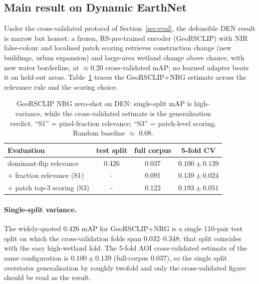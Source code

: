 \documentclass{article}
\begin{document}
\subsection{Main result on Dynamic EarthNet}
\label{sec:denmain}

Under the cross-validated protocol of Section~\ref{sec:eval}, the defensible DEN
result is narrow but honest: a frozen, RS-pre-trained encoder (GeoRSCLIP) with
NIR false-colour and localised patch scoring retrieves construction change (new
buildings, urban expansion) and large-area wetland change above chance, with new
water borderline, at $\approx$0.20 cross-validated mAP; no learned adapter beats
it on held-out areas. Table~\ref{tab:cv} traces the GeoRSCLIP+NRG estimate across
the relevance rule and the scoring choice.

\begin{table}[H]
    \centering
    \caption{GeoRSCLIP NRG zero-shot on DEN: single-split mAP is high-variance,
    while the cross-validated estimate is the generalisation verdict. ``S1'' =
    pixel-fraction relevance; ``S3'' = patch-level scoring. Random baseline
    $\approx$ 0.08.}
    \label{tab:cv}
    \begin{tabular}{lccc}
        \toprule
        \textbf{Evaluation} & \textbf{test split} & \textbf{full corpus} & \textbf{5-fold CV} \\
        \midrule
        dominant-flip relevance      & 0.426 & 0.037 & $0.100 \pm 0.139$ \\
        + fraction relevance (S1)    & -   & 0.091 & $0.139 \pm 0.024$ \\
        + patch top-3 scoring (S3)   & -   & 0.122 & $\mathbf{0.193 \pm 0.051}$ \\
        \bottomrule
    \end{tabular}
\end{table}

\paragraph{Single-split variance.}
The widely-quoted 0.426 mAP for GeoRSCLIP+NRG is a single 110-pair test split on
which the cross-validation folds span 0.032--0.348; that split coincides with the
easy high-wetland fold. The 5-fold AOI cross-validated estimate of the same
configuration is $0.100 \pm 0.139$ (full-corpus 0.037), so the single split
overstates generalisation by roughly twofold and only the cross-validated figure
should be read as the result.
\end{document}
